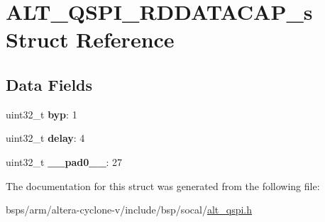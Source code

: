 \hypertarget{structALT__QSPI__RDDATACAP__s}{}\section{A\+L\+T\+\_\+\+Q\+S\+P\+I\+\_\+\+R\+D\+D\+A\+T\+A\+C\+A\+P\+\_\+s Struct Reference}
\label{structALT__QSPI__RDDATACAP__s}
\subsection*{Data Fields}
\begin{DoxyCompactItemize}
\item 
\mbox{\label{structALT__QSPI__RDDATACAP__s_a85870bb547889a86ba3ec5a05c691a7c}} 
uint32\+\_\+t {\bfseries byp}\+: 1
\item 
\mbox{\label{structALT__QSPI__RDDATACAP__s_ae7bff63b32e163e5ee923332d35cf464}} 
uint32\+\_\+t {\bfseries delay}\+: 4
\item 
\mbox{\label{structALT__QSPI__RDDATACAP__s_a7a05b41ae01fd14f18966db5a9f7ea09}} 
uint32\+\_\+t {\bfseries \+\_\+\+\_\+pad0\+\_\+\+\_\+}\+: 27
\end{DoxyCompactItemize}


The documentation for this struct was generated from the following file\+:\begin{DoxyCompactItemize}
\item 
bsps/arm/altera-\/cyclone-\/v/include/bsp/socal/\mbox{\hyperlink{include_2bsp_2socal_2alt__qspi_8h}{alt\+\_\+qspi.\+h}}\end{DoxyCompactItemize}
